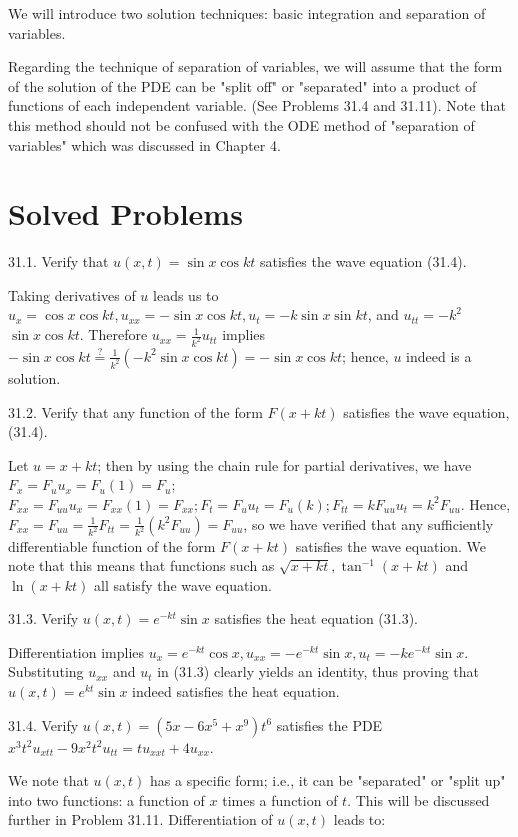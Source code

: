 \documentclass[10pt]{article}
\begin{document}
We will introduce two solution techniques: basic integration and separation of variables.

Regarding the technique of separation of variables, we will assume that the form of the solution of the PDE can be "split off" or "separated" into a product of functions of each independent variable. (See Problems 31.4 and 31.11). Note that this method should not be confused with the ODE method of "separation of variables" which was discussed in Chapter 4.

\section*{Solved Problems}
31.1. Verify that $u(x, t)=\sin x \cos k t$ satisfies the wave equation (31.4).

Taking derivatives of $u$ leads us to $u_{x}=\cos x \cos k t, u_{x x}=-\sin x \cos k t, u_{t}=-k \sin x \sin k t$, and $u_{t t}=-k^{2}$ $\sin x \cos k t$. Therefore $u_{x x}=\frac{1}{k^{2}} u_{t t}$ implies $-\sin x \cos k t \stackrel{?}{=} \frac{1}{k^{2}}\left(-k^{2} \sin x \cos k t\right)=-\sin x \cos k t$; hence, $u$ indeed is a solution.

31.2. Verify that any function of the form $F(x+k t)$ satisfies the wave equation, (31.4).

Let $u=x+k t$; then by using the chain rule for partial derivatives, we have $F_{x}=F_{u} u_{x}=F_{u}(1)=F_{u}$; $F_{x x}=F_{u u} u_{x}=F_{x x}(1)=F_{x x} ; F_{t}=F_{u} u_{t}=F_{u}(k) ; F_{t t}=k F_{u u} u_{t}=k^{2} F_{u u}$. Hence, $F_{x x}=F_{u u}=\frac{1}{k^{2}} F_{t t}=\frac{1}{k^{2}}\left(k^{2} F_{u u}\right)=F_{u u}$, so we have verified that any sufficiently differentiable function of the form $F(x+k t)$ satisfies the wave equation. We note that this means that functions such as $\sqrt{x+k t}, \tan ^{-1}(x+k t)$ and $\ln (x+k t)$ all satisfy the wave equation.

31.3. Verify $u(x, t)=e^{-k t} \sin x$ satisfies the heat equation (31.3).

Differentiation implies $u_{x}=e^{-k t} \cos x, u_{x x}=-e^{-k t} \sin x, u_{t}=-k e^{-k t} \sin x$. Substituting $u_{x x}$ and $u_{t}$ in (31.3) clearly yields an identity, thus proving that $u(x, t)=e^{k t} \sin x$ indeed satisfies the heat equation.

31.4. Verify $u(x, t)=\left(5 x-6 x^{5}+x^{9}\right) t^{6}$ satisfies the PDE $x^{3} t^{2} u_{x t t}-9 x^{2} t^{2} u_{t t}=t u_{x x t}+4 u_{x x}$.

We note that $u(x, t)$ has a specific form; i.e., it can be "separated" or "split up" into two functions: a function of $x$ times a function of $t$. This will be discussed further in Problem 31.11. Differentiation of $u(x, t)$ leads to:
\end{document}
